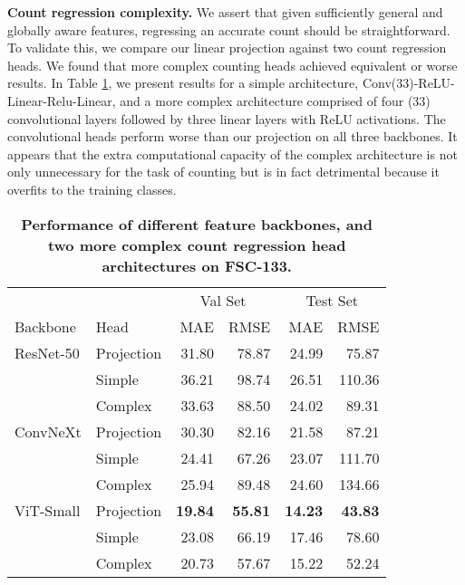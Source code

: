 \documentclass[letterpaper, 11pt]{IEEEtran}
\begin{document}
\vspace{5mm}

\textbf{Count regression complexity.}
We assert that given sufficiently general and globally aware features, regressing an accurate count should be straightforward. To validate this, we compare our linear projection against two count regression heads. We found that more complex counting heads achieved equivalent or worse results. In Table \ref{ablation_arch}, we present results for a simple architecture, Conv(33)-ReLU-Linear-Relu-Linear, and a more complex architecture comprised of four (33) convolutional layers followed by three linear layers with ReLU activations. The convolutional heads perform worse than our projection on all three backbones. It appears that the extra computational capacity of the complex architecture is not only unnecessary for the task of counting but is in fact detrimental because it overfits to the training classes.
\begin{table}
    \centering
    \fontsize{9}{9}\selectfont
    \begin{tabular}{llrrrr}
\toprule
 & & \multicolumn{2}{c}{Val Set} & \multicolumn{2}{c}{Test Set} \\
 Backbone & Head & MAE & RMSE & MAE & RMSE \\
 \midrule

ResNet-50 & Projection & 31.80 & 78.87 & 24.99 & 75.87 \\
& Simple & 36.21 & 98.74 & 26.51 & 110.36\\
& Complex & 33.63 & 88.50 & 24.02 & 89.31
\\


ConvNeXt & Projection & 30.30 & 82.16 & 21.58 & 87.21 \\
 & Simple & 24.41 & 67.26 & 23.07 & 111.70 \\
 & Complex &  25.94 & 89.48 & 24.60 & 134.66 \\
ViT-Small & Projection & \textbf{19.84}  & \textbf{55.81} & \textbf{14.23}  & \textbf{43.83} \\

 & Simple & 23.08 & 66.19 & 17.46 & 78.60 \\
 &  Complex & 20.73 & 57.67 & 15.22 & 52.24 \\
\bottomrule
\end{tabular}
     \caption{\textbf{Performance of different feature backbones, and two more complex count regression head architectures on FSC-133.}
    }
    \label{ablation_arch}
\end{table}
\end{document}
